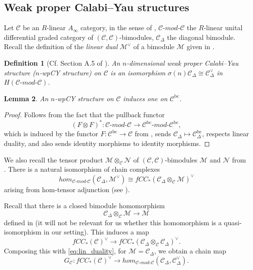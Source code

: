 \documentclass{article}
\newtheorem{lem}{Lemma}[section]
\newtheorem{defn}[lem]{Definition}
\def\bc{\mathsf{bc}}
\def\cM{\mathcal{M}}
\def\cM{\mathcal{M}}
\def\cC{\mathcal{C}}
\def\bc{{\operatorname{bc}}}
\newcommand{\bimod}[2]{{{#1}\text{-}mod\text{-}{#2}}}
\def\cN{\mathcal{N}}
\begin{document}
\subsection{Weak proper Calabi--Yau structures}

Let $\cC$ be an $R$-linear $A_\infty$ category, in the sense of \cite[Definition 2.10]{relfukii}, $\bimod{\cC}{\cC}$ the $R$-linear unital differential graded category of $(\cC,\cC)$-bimodules, $\cC_\Delta$ the diagonal bimodule. 
Recall the definition of the \emph{linear dual} $\mathcal{M}^\vee$ of a bimodule $\mathcal{M}$ given in \cite[Equation (2.11)]{Seidel_II}.

\begin{defn}[Cf. Section A.5 of \cite{Sheridan2013}]
    An \emph{$n$-dimensional weak proper Calabi--Yau structure} ($n$-wpCY structure) on $\cC$ is an isomorphism $\sigma(n)\cC_\Delta \cong \cC_\Delta^\vee$ in $H(\bimod{\cC}{\cC})$.
\end{defn}

\begin{lem}\label{lem:wpcy_bc}
    An $n$-wpCY structure on $\cC$ induces one on $\cC^\bc$.
\end{lem}
\begin{proof}
    Follows from the fact that the pullback functor 
    $$(F \otimes F)^*: \bimod{\cC}{\cC} \to \bimod{\cC^\bc}{\cC^\bc},$$
    which is induced by the functor $F:\cC^\bc \to \cC$ from \cite[Lemma 2.14]{relfukii}, sends $\cC_\Delta \mapsto \cC^\bc_\Delta$, respects linear duality, and also sends identity morphisms to identity morphisms.
\end{proof}

We also recall the tensor product $\cM \otimes_\cC \cN$ of $(\cC,\cC)$-bimodules $\cM$ and $\cN$ from \cite[Equations (2.12-13)]{Seidel_II}. 
There is a natural isomorphism of chain complexes
\begin{equation}\label{eq:lin_duality}
hom_{\bimod{\cC}{\cC}}(\cC_\Delta,\cM^\vee) \cong fCC_*(\cC_\Delta \otimes_\cC \cM)^\vee
\end{equation}
arising from hom-tensor adjunction (see \cite[Equation (2.26)]{Seidel_II}).

Recall that there is a closed bimodule homomorphism
$$\cC_\Delta \otimes_\cC \cM \to \cM$$
defined in \cite[Equation (2.7)]{Seidel_nat_transf} (it will not be relevant for us whether this homomorphism is a quasi-isomorphism in our setting).
This induces a map
$$fCC_*(\cC)^\vee \to fCC_*(\cC_\Delta \otimes_\cC \cC_\Delta)^\vee.$$
Composing this with \eqref{eq:lin_duality}, for $\cM = \cC_\Delta$, we obtain a chain map
$$G_\cC: fCC_*(\cC)^\vee \to hom_{\bimod{\cC}{\cC}}(\cC_\Delta,\cC_\Delta^\vee).$$
\end{document}
